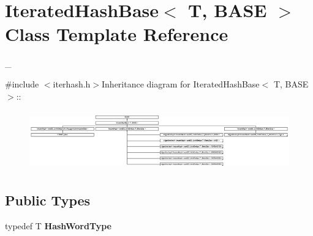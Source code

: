 \hypertarget{class_iterated_hash_base}{
\section{IteratedHashBase$<$ T, BASE $>$ Class Template Reference}
\label{class_iterated_hash_base}
}


\_\-  


{\ttfamily \#include $<$iterhash.h$>$}Inheritance diagram for IteratedHashBase$<$ T, BASE $>$::\begin{figure}[H]
\begin{center}
\leavevmode
\includegraphics[height=2.59794cm]{class_iterated_hash_base}
\end{center}
\end{figure}
\subsection*{Public Types}
\begin{DoxyCompactItemize}
\item 
\hypertarget{class_iterated_hash_base_a4316d6e7e38a407d5a71f95de2b112e1}{
typedef T {\bfseries HashWordType}}
\label{class_iterated_hash_base_a4316d6e7e38a407d5a71f95de2b112e1}

\end{DoxyCompactItemize}
